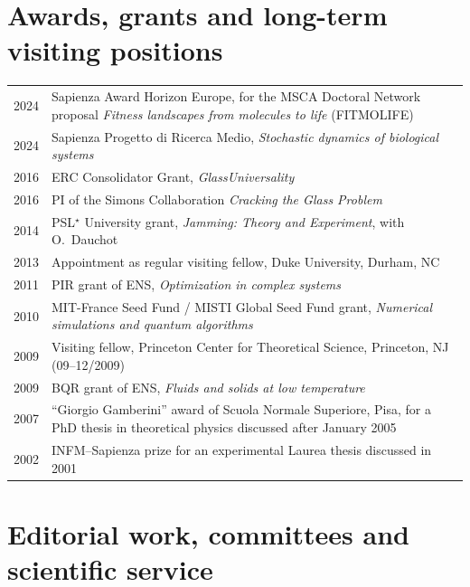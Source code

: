 \documentclass[a4paper,10pt]{article}
\begin{document}
\section{Awards, grants and long-term visiting positions}

\begin{tabularx}{\textwidth}{@{}D L@{}}
2024 & Sapienza Award Horizon Europe, for the MSCA Doctoral Network proposal \emph{Fitness landscapes from molecules to life} (FITMOLIFE) \\
2024 & Sapienza Progetto di Ricerca Medio, \emph{Stochastic dynamics of biological systems} \\
2016 & ERC Consolidator Grant, \emph{GlassUniversality} \\
2016 & PI of the Simons Collaboration \emph{Cracking the Glass Problem} \\
2014 & PSL$^\star$ University grant, \emph{Jamming: Theory and Experiment}, with O.~Dauchot \\
2013 & Appointment as regular visiting fellow, Duke University, Durham, NC \\
2011 & PIR grant of ENS, \emph{Optimization in complex systems} \\
2010 & MIT-France Seed Fund / MISTI Global Seed Fund grant, \emph{Numerical simulations and quantum algorithms} \\
2009 & Visiting fellow, Princeton Center for Theoretical Science, Princeton, NJ (09--12/2009) \\
2009 & BQR grant of ENS, \emph{Fluids and solids at low temperature} \\
2007 & ``Giorgio Gamberini'' award of Scuola Normale Superiore, Pisa, for a PhD thesis in theoretical physics discussed after January 2005 \\
2002 & INFM--Sapienza prize for an experimental Laurea thesis discussed in 2001 \\
\end{tabularx}

\section{Editorial work, committees and scientific service}
\end{document}

